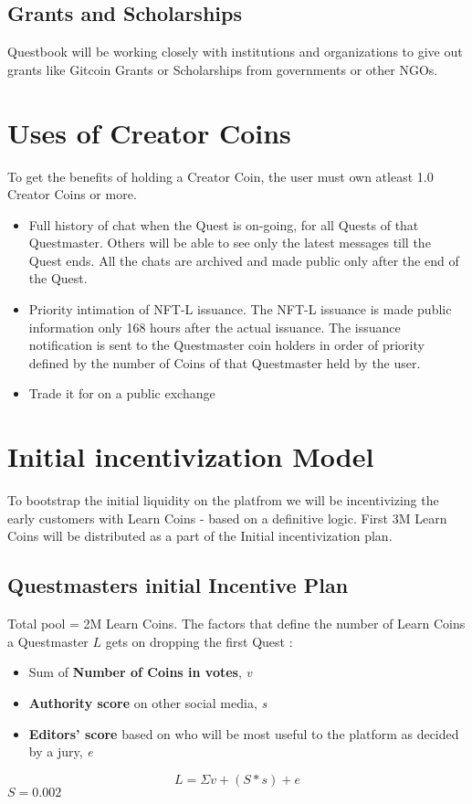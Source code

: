 \documentclass{article}
\begin{document}
    \subsection{Grants and Scholarships}
      Questbook will be working closely with institutions and organizations to give out grants like Gitcoin Grants or Scholarships from governments or other NGOs.
  \section{Uses of Creator Coins}
    To get the benefits of holding a Creator Coin, the user must own atleast 1.0 Creator Coins or more. 
    \begin{itemize}
      \item Full history of chat when the Quest is on-going, for all Quests of that Questmaster. Others will be able to see only the latest messages till the Quest ends. All the chats are archived and made public only after the end of the Quest.
      \item Priority intimation of NFT-L issuance. The NFT-L issuance is made public information only 168 hours after the actual issuance. The issuance notification is sent to the Questmaster coin holders in order of priority defined by the number of Coins of that Questmaster held by the user.
      \item Trade it for on a public exchange
    \end{itemize}

  \section{Initial incentivization Model}
    To bootstrap the initial liquidity on the platfrom we will be incentivizing the early customers with Learn Coins - based on a definitive logic.
    First 3M Learn Coins will be distributed as a part of the Initial incentivization plan.
    \subsection{Questmasters initial Incentive Plan}
      Total pool = 2M Learn Coins.
      The factors that define the number of Learn Coins a Questmaster \(L\) gets on dropping the first Quest :
      \begin{itemize}
        \item Sum of \textbf{Number of Coins in votes}, \textit{v}
        \item \textbf{Authority score} on other social media, \textit{s}
        \item \textbf{Editors' score} based on who will be most useful to the platform as decided by a jury, \textit{e}
      \end{itemize} 
      \[
        L = \Sigma v + (S * s) + e
      \]
      \(S = 0.002\)
\end{document}
